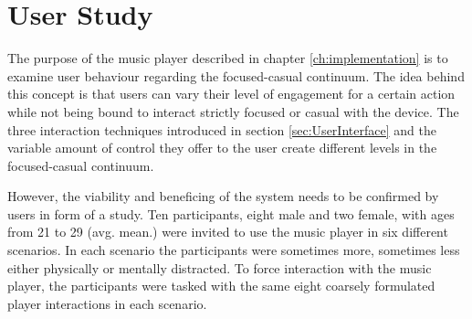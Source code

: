 \chapter{User Study}\label{ch:userStudy}









The purpose of the music player described in chapter \ref{ch:implementation} is to examine user behaviour regarding the focused-casual continuum. The idea behind this concept is that users can vary their level of engagement for a certain action while not being bound to interact strictly focused or casual with the device. The three interaction techniques introduced in section \ref{sec:UserInterface} and the variable amount of control they offer to the user create different levels in the focused-casual continuum. 

However, the viability and beneficing of the system needs to be confirmed by users in form of a study. Ten participants, eight male and two female, with ages from 21 to 29 (avg. mean.) were invited to use the music player in six different scenarios. In each scenario the participants were sometimes more, sometimes less either physically or mentally distracted. To force interaction with the music player, the participants were tasked with the same eight coarsely formulated player interactions in each scenario.







